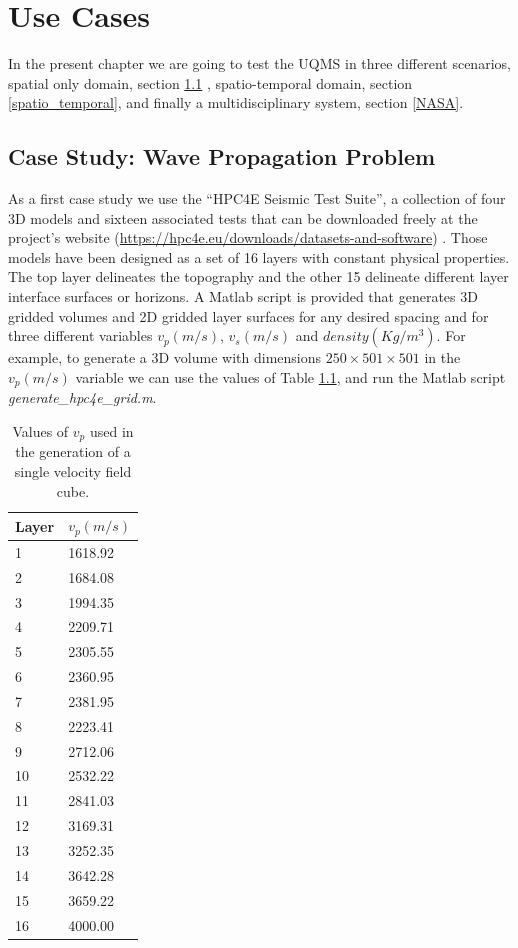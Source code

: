 \chapter[Use Cases]{Use Cases}\label{cap:use_cases}
In the present chapter we are going to test the UQMS in three different scenarios, spatial only domain, section \ref{Wave Propagation} , spatio-temporal domain, section \ref{spatio_temporal}, and finally a multidisciplinary system, section \ref{NASA}. 

\section{Case Study:  Wave Propagation Problem}\label{Wave Propagation}
As a first case study we use the “HPC4E Seismic Test Suite”, a collection of four 3D models and sixteen associated tests that can be downloaded freely at the project's website (\url{https://hpc4e.eu/downloads/datasets-and-software}) \cite{deLaPuente2015}. Those models have been designed as a set of 16 layers with constant physical properties. The top layer delineates the topography and the other 15 delineate different layer interface surfaces or horizons. A Matlab script is provided that generates 3D gridded volumes and 2D gridded layer surfaces for any desired spacing and for three different variables $v_{p}(m/s)$, $v_{s}(m/s)$ and $density(Kg/m^3)$. For example, to generate a 3D volume with dimensions $250\times501\times501$ in the $v_{p}(m/s)$ variable we can use the values of Table \ref{tab:valuesOfVp}, and run the Matlab script \textit{generate\_hpc4e\_grid.m}.

\begin{table}[H]
\begin{center}
    \begin{tabular}{|l|l|}
    \hline
    \textbf{Layer} & $v_{p}(m/s)$ \\ \hline
    1     & 1618.92 \\ \hline
    2     & 1684.08 \\ \hline
    3     & 1994.35 \\ \hline
    4     & 2209.71 \\ \hline
    5     & 2305.55 \\ \hline
    6     & 2360.95 \\ \hline
    7     & 2381.95 \\ \hline
    8     & 2223.41 \\ \hline
    9     & 2712.06 \\ \hline
    10    & 2532.22 \\ \hline
    11    & 2841.03 \\ \hline
    12    & 3169.31 \\ \hline
    13    & 3252.35 \\ \hline
    14    & 3642.28 \\ \hline
    15    & 3659.22 \\ \hline
    16    & 4000.00 \\ \hline
    \end{tabular}
    \caption {Values of $v_{p}$ used in the generation of a single velocity field cube.}
    \label{tab:valuesOfVp}
    \end{center}
\end{table}

